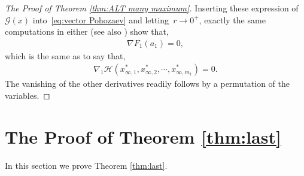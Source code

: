 \documentclass[10pt]{amsart}
\renewcommand{\to}{\rightarrow}
\begin{document}
\begin{proof}[The Proof of Theorem \ref{thm:ALT many maximum}]
         Inserting these expression of $\mathcal{G}(x)$ into~\eqref{eq:vector Pohozaev} and letting~$r\to 0^+$,
         exactly the same computations in either \cite{MaW} (see also \cite{BJW}) show that,
        \begin{align*}
            \nabla F_1(a_1)=0,
        \end{align*}
        which is the same as to say that,
        \begin{align*}
            \nabla_1 \mathcal{H}(x^*_{\infty, 1},x^*_{\infty, 2},\cdots, x^*_{\infty, m_1})=0.
        \end{align*}
        The vanishing of the other derivatives readily follows by a permutation of the variables.
\end{proof}

\bigskip

\section{The Proof of Theorem \ref{thm:last}}\label{sec7}
In this section we prove Theorem \ref{thm:last}.
\end{document}
